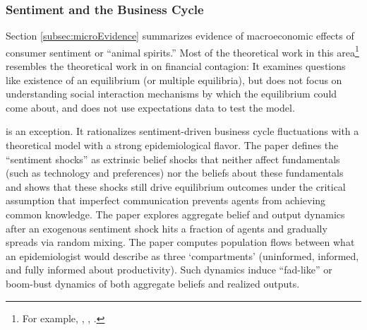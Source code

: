 \subsubsection{Sentiment and the Business Cycle}

Section \ref{subsec:microEvidence} summarizes evidence of macroeconomic effects of consumer sentiment or ``animal spirits.''  Most of the theoretical work in this area\footnote{For example, \cite{angeletos2010noisy}, \cite{benhabib2015sentiments}, \cite{angeletos2018quantifying}.}  resembles the theoretical work in on financial contagion:  It examines questions like existence of an equilibrium (or multiple equilibria), but does not focus on understanding social interaction mechanisms by which the equilibrium could come about, and does not use expectations data to test the model.

\cite{angeletos2013sentiments} is an exception.  It rationalizes sentiment-driven business cycle fluctuations with a theoretical model with a strong epidemiological flavor. The paper defines the ``sentiment shocks'' as extrinsic belief shocks that neither affect fundamentals (such as technology and preferences) nor the beliefs about these fundamentals and shows that these shocks still drive equilibrium outcomes under the critical assumption that imperfect communication prevents agents from achieving common knowledge.  The paper explores aggregate belief and output dynamics after an exogenous sentiment shock hits a fraction of agents and gradually spreads via random mixing.  The paper computes  population flows between what an epidemiologist would describe as three `compartments' (uninformed, informed, and fully informed about productivity). Such dynamics induce ``fad-like'' or boom-bust dynamics of both aggregate beliefs and realized outputs.





